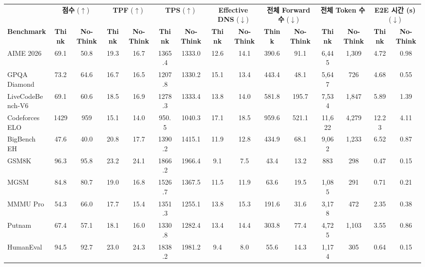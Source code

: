 \documentclass[11pt, a4paper, logo, copyright, gdm]{google}
\begin{document}
\begin{landscape}
\begin{table}[t!]
\centering
\small
\setlength{\tabcolsep}{2.5pt}
\begin{tabular}{l|cc|cc|cc|cc|cc|cc|cc}
\toprule
 & \multicolumn{2}{c}{\textbf{점수} ($\uparrow$)} & \multicolumn{2}{c}{\textbf{TPF} ($\uparrow$)} & \multicolumn{2}{c}{\textbf{TPS} ($\uparrow$)} & \multicolumn{2}{c}{\textbf{Effective DNS} ($\downarrow$)} & \multicolumn{2}{c}{\textbf{전체 Forward 수} ($\downarrow$)} & \multicolumn{2}{c}{\textbf{전체 Token 수}} & \multicolumn{2}{c}{\textbf{E2E 시간 (s)} ($\downarrow$)} \\
\cmidrule(lr){2-3} \cmidrule(lr){4-5} \cmidrule(lr){6-7} \cmidrule(lr){8-9} \cmidrule(lr){10-11} \cmidrule(lr){12-13} \cmidrule(lr){14-15}
\textbf{Benchmark} & \textbf{Think} & \textbf{No-Think} & \textbf{Think} & \textbf{No-Think} & \textbf{Think} & \textbf{No-Think} & \textbf{Think} & \textbf{No-Think} & \textbf{Think} & \textbf{No-Think} & \textbf{Think} & \textbf{No-Think} & \textbf{Think} & \textbf{No-Think} \\
\midrule
AIME 2026 & 69.1 & 50.8 & 19.3 & 16.7 & 1365.4 & 1333.0 & 12.6 & 14.1 & 390.6 & 91.1 & 6,445 & 1,309 & 4.72 & 0.98 \\
GPQA Diamond & 73.2 & 64.6 & 16.7 & 16.5 & 1207.8 & 1330.2 & 15.1 & 13.4 & 443.4 & 48.1 & 5,647 & 726 & 4.68 & 0.55 \\
LiveCodeBench-V6 & 69.1 & 60.6 & 18.5 & 16.9 & 1278.3 & 1333.4 & 13.8 & 14.0 & 581.8 & 195.7 & 7,534 & 1,847 & 5.89 & 1.39 \\
Codeforces ELO & 1429 & 959 & 15.1 & 14.0 & 950.5 & 1040.3 & 17.1 & 18.5 & 959.6 & 521.1 & 11,622 & 4,279 & 12.23 & 4.11 \\
BigBench EH & 47.6 & 40.0 & 20.8 & 17.7 & 1390.2 & 1415.1 & 11.9 & 12.8 & 434.9 & 68.1 & 9,062 & 1,233 & 6.52 & 0.87 \\
GSM8K & 96.3 & 95.8 & 23.2 & 24.1 & 1866.2 & 1966.4 & 9.1 & 7.5 & 43.4 & 13.2 & 883 & 298 & 0.47 & 0.15 \\
MGSM & 84.8 & 80.7 & 19.0 & 16.8 & 1526.7 & 1367.5 & 11.5 & 11.9 & 63.6 & 19.5 & 1,085 & 291 & 0.71 & 0.21 \\
MMMU Pro & 54.3 & 66.0 & 17.7 & 15.4 & 1351.3 & 1255.1 & 13.8 & 15.3 & 191.6 & 31.6 & 3,178 & 472 & 2.35 & 0.38 \\
Putnam & 67.4 & 57.1 & 18.1 & 16.0 & 1330.8 & 1282.4 & 13.4 & 14.4 & 303.8 & 77.4 & 4,725 & 1,103 & 3.55 & 0.86 \\
HumanEval & 94.5 & 92.7 & 23.0 & 24.3 & 1838.2 & 1981.2 & 9.4 & 8.0 & 55.6 & 14.3 & 1,174 & 305 & 0.64 & 0.15 \\

\end{tabular}
\end{table}
\end{landscape}
\end{document}
